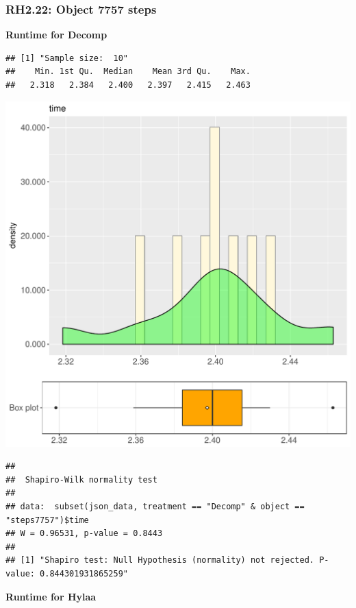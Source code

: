 \documentclass{article}\usepackage[]{graphicx}\usepackage[]{color}
\makeatletter
\def\maxwidth{ %
  \ifdim\Gin@nat@width>\linewidth
    \linewidth
  \else
    \Gin@nat@width
  \fi
}
\newenvironment{kframe}{%
 \def\at@end@of@kframe{}%
 \ifinner\ifhmode%
  \def\at@end@of@kframe{\end{minipage}}%
  \begin{minipage}{\columnwidth}%
 \fi\fi%
 \def\FrameCommand##1{\hskip\@totalleftmargin \hskip-\fboxsep
 \colorbox{shadecolor}{##1}\hskip-\fboxsep
     \hskip-\linewidth \hskip-\@totalleftmargin \hskip\columnwidth}%
 \MakeFramed {\advance\hsize-\width
   \@totalleftmargin\z@ \linewidth\hsize
   \@setminipage}}%
 {\par\unskip\endMakeFramed%
 \at@end@of@kframe}
\newenvironment{knitrout}{}{} %
\makeatother
\begin{document}
\subsubsection{RH2.22: Object 7757 steps}

 \textbf{Runtime for Decomp}
\begin{knitrout}
\color{fgcolor}\begin{kframe}
\begin{verbatim}
## [1] "Sample size:  10"
##    Min. 1st Qu.  Median    Mean 3rd Qu.    Max. 
##   2.318   2.384   2.400   2.397   2.415   2.463
\end{verbatim}
\end{kframe}
\includegraphics[width=\maxwidth]{figure/RH2_Decomp_steps7757-1} 
\begin{kframe}\begin{verbatim}
## 
## 	Shapiro-Wilk normality test
## 
## data:  subset(json_data, treatment == "Decomp" & object == "steps7757")$time
## W = 0.96531, p-value = 0.8443
## 
## [1] "Shapiro test: Null Hypothesis (normality) not rejected. P-value: 0.844301931865259"
\end{verbatim}
\end{kframe}
\end{knitrout}
 \textbf{Runtime for Hylaa}
\end{document}
